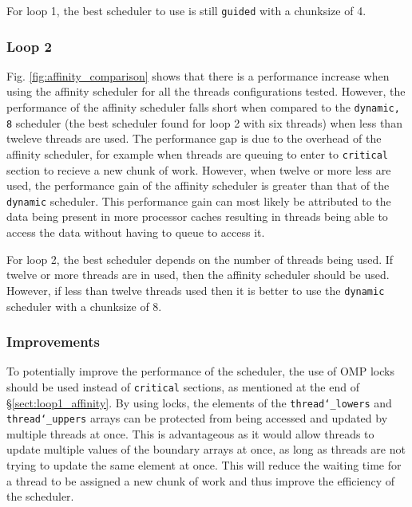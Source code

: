 \documentclass[11pt, a4paper]{article}
\begin{document}
				For loop 1, the best scheduler to use is still \texttt{guided} with a chunksize of 4.
				
			\subsubsection{Loop 2} \label{sect:loop2_affinity}
				Fig. \ref{fig:affinity_comparison} shows that there is a performance increase when using the affinity scheduler for all the threads configurations tested. However, the performance of the affinity scheduler falls short when compared to the \texttt{dynamic, 8} scheduler (the best scheduler found for loop 2 with six threads) when less than tweleve threads are used. The performance gap is due to the overhead of the affinity scheduler, for example when threads are queuing to enter to \texttt{critical} section to recieve a new chunk of work. However, when twelve or more less are used, the performance gain of the affinity scheduler is greater than that of the \texttt{dynamic} scheduler. This performance gain can most likely be attributed to the data being present in more processor caches resulting in threads being able to access the data without having to queue to access it.
				
				For loop 2, the best scheduler depends on the number of threads being used. If twelve or more threads are in used, then the affinity scheduler should be used. However, if less than twelve threads used then it is better to use the \texttt{dynamic} scheduler with a chunksize of 8.
				
			\subsubsection{Improvements} \label{sect:perf_increase}
				To potentially improve the performance of the scheduler, the use of OMP locks should be used instead of \texttt{critical} sections, as mentioned at the end of \S\ref{sect:loop1_affinity}. By using locks, the elements of the \texttt{thread\char`_lowers} and \texttt{thread\char`_uppers} arrays can be protected from being accessed and updated by multiple threads at once. This is advantageous as it would allow threads to update multiple values of the boundary arrays at once, as long as threads are not trying to update the same element at once. This will reduce the waiting time for a thread to be assigned a new chunk of work and thus improve the efficiency of the scheduler. 
	
\end{document}
